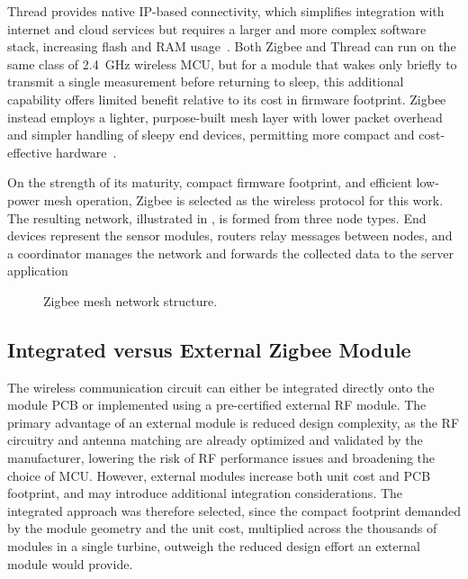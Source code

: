 Thread provides native IP-based connectivity, which simplifies integration with internet and cloud services but requires a larger and more complex software stack, increasing flash and RAM usage~\cite{Thread_vs_zigbee}. Both Zigbee and Thread can run on the same class of \SI{2.4}{\giga\hertz} wireless MCU, but for a module that wakes only briefly to transmit a single measurement before returning to sleep, this additional capability offers limited benefit relative to its cost in firmware footprint. Zigbee instead employs a lighter, purpose-built mesh layer with lower packet overhead and simpler handling of sleepy end devices, permitting more compact and cost-effective hardware~\cite{Zigbee_alliance}.

On the strength of its maturity, compact firmware footprint, and efficient low-power mesh operation, Zigbee is selected as the wireless protocol for this work. The resulting network, illustrated in , is formed from three node types. End devices represent the sensor modules, routers relay messages between nodes, and a coordinator manages the network and forwards the collected data to the server application

\begin{figure}
\centering

    \caption{Zigbee mesh network structure.}
    \label{fig:Zigbee_Network}
\end{figure}

\subsection{Integrated versus External Zigbee Module}
 
The wireless communication circuit can either be integrated directly onto the module PCB or implemented using a pre-certified external RF module. The primary advantage of an external module is reduced design complexity, as the RF circuitry and antenna matching are already optimized and validated by the manufacturer, lowering the risk of RF performance issues and broadening the choice of MCU. However, external modules increase both unit cost and PCB footprint, and may introduce additional integration considerations. The integrated approach was therefore selected, since the compact footprint demanded by the module geometry and the unit cost, multiplied across the thousands of modules in a single turbine, outweigh the reduced design effort an external module would provide.

